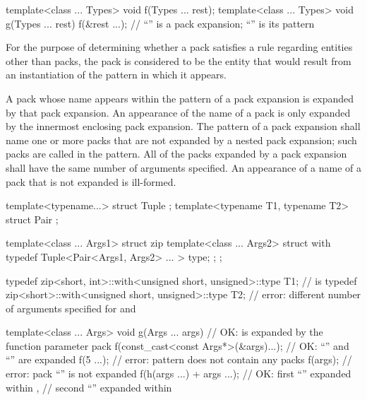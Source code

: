 \begin{example}
\begin{codeblock}
template<class ... Types> void f(Types ... rest);
template<class ... Types> void g(Types ... rest) {
  f(&rest ...);     // ``'' is a pack expansion; ``'' is its pattern
}
\end{codeblock}
\end{example}

\pnum
For the purpose of determining whether a pack satisfies a rule
regarding entities other than packs, the pack is
considered to be the entity that would result from an instantiation of
the pattern in which it appears.

\pnum
A pack whose name appears within the pattern of a pack
expansion is expanded by that pack expansion. An appearance of the name of
a pack is only expanded by the innermost enclosing pack expansion.
The pattern of a pack expansion shall name one or more packs that
are not expanded by a nested pack expansion; such packs are called
 in the pattern. All of the packs expanded
by a pack expansion shall have the same number of arguments specified. An
appearance of a name of a pack that is not expanded is
ill-formed.
\begin{example}
\begin{codeblock}
template<typename...> struct Tuple {};
template<typename T1, typename T2> struct Pair {};

template<class ... Args1> struct zip {
  template<class ... Args2> struct with {
    typedef Tuple<Pair<Args1, Args2> ... > type;
  };
};

typedef zip<short, int>::with<unsigned short, unsigned>::type T1;
    //  is 
typedef zip<short>::with<unsigned short, unsigned>::type T2;
    // error: different number of arguments specified for  and 

template<class ... Args>
  void g(Args ... args) {                   // OK:  is expanded by the function parameter pack 
    f(const_cast<const Args*>(&args)...);   // OK: ``'' and ``'' are expanded
    f(5 ...);                               // error: pattern does not contain any packs
    f(args);                                // error: pack ``'' is not expanded
    f(h(args ...) + args ...);              // OK: first ``'' expanded within ,
                                            // second ``'' expanded within 
  }
\end{codeblock}
\end{example}


